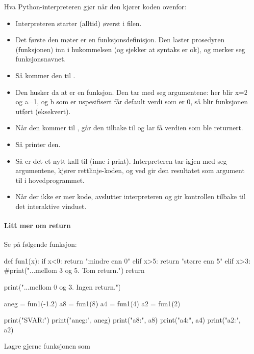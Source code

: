 Hva Python-interpreteren gjør når den kjører koden ovenfor:
\begin{itemize}
\item Interpreteren starter (alltid) øverst i filen.
\item Det første den møter er en funksjonsdefinisjon. Den laster prosedyren (funksjonen) inn i hukommelsen (og sjekker at syntaks er ok), og merker seg funksjonsnavnet. 
\item Så kommer den til .
\item Den husker da at  er en funksjon. Den tar med seg argumentene: her blir x=2 og a=1, og b som er uspesifisert får default verdi som er 0, så blir funksjonen utført (eksekvert).
\item Når den kommer til , går den tilbake til  og lar  få verdien som ble returnert.
\item Så printer den. 
\item Så er det et nytt kall til  (inne i print). Interpreteren tar igjen med seg argumentene, kjører rettlinje-koden, og ved  gir den resultatet som argument til  i hovedprogrammet.
\item Når der ikke er mer kode, avslutter interpreteren og gir kontrollen tilbake til det interaktive vinduet. 
\end{itemize}

\paragraph*{Litt mer om return}

Se på følgende funksjon: 

\begin{usncodebox}
def fun1(x):
   if x<0:
      return "mindre enn 0"
   elif x>5:
      return "større enn 5"
   elif x>3: 
      #print("...mellom 3 og 5. Tom return.")
      return

   print("...mellom 0 og 3. Ingen return.")

aneg = fun1(-1.2)
a8 = fun1(8)
a4 = fun1(4)
a2 = fun1(2)

print("SVAR:") 
print("aneg:", aneg)
print("a8:", a8)
print("a4:", a4)
print("a2:", a2)
\end{usncodebox}

Lagre gjerne funksjonen som 

